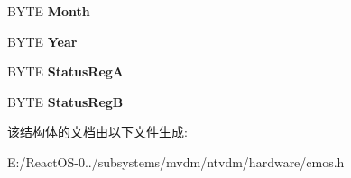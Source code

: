 \begin{DoxyCompactItemize}
B\+Y\+TE {\bfseries Month}
\item 
\mbox{\label{struct_c_m_o_s___c_l_o_c_k_a6005659b548cb22e2d0ae17511d813f1}} 
B\+Y\+TE {\bfseries Year}
\item 
\mbox{\label{struct_c_m_o_s___c_l_o_c_k_a3726fec44c09a8fe8fae07621a67f090}} 
B\+Y\+TE {\bfseries Status\+RegA}
\item 
\mbox{\label{struct_c_m_o_s___c_l_o_c_k_ae5eae9ce87ac4089df69f64196bfd84b}} 
B\+Y\+TE {\bfseries Status\+RegB}
\end{DoxyCompactItemize}


该结构体的文档由以下文件生成\+:\begin{DoxyCompactItemize}
\item 
E\+:/\+React\+O\+S-\/0../subsystems/mvdm/ntvdm/hardware/cmos.\+h\end{DoxyCompactItemize}
